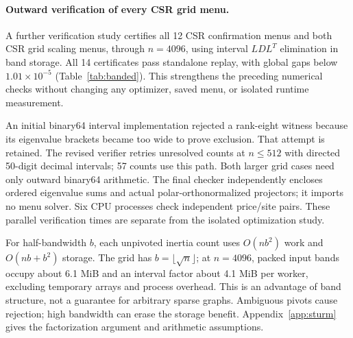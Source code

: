 \paragraph{Outward verification of every CSR grid menu.}
A further verification study certifies all 12 CSR confirmation menus and
both CSR grid scaling menus, through $n=4096$, using interval $LDL^T$
elimination in band storage. All 14 certificates pass standalone replay,
with global gaps below $1.01\times10^{-5}$ (Table~\ref{tab:banded}).
This strengthens the preceding numerical checks without changing any
optimizer, saved menu, or isolated runtime measurement.

An initial binary64 interval implementation rejected a rank-eight witness
because its eigenvalue brackets became too wide to prove exclusion. That
attempt is retained. The revised verifier retries unresolved counts at
$n\le512$ with directed 50-digit decimal intervals; 57 counts use this
path. Both larger grid cases need only outward binary64 arithmetic.
The final checker independently encloses ordered eigenvalue sums and actual
polar-orthonormalized projectors; it imports no menu solver. Six CPU
processes check independent price/site pairs. These parallel verification
times are separate from the isolated optimization study.

For half-bandwidth $b$, each unpivoted inertia count uses $O(nb^2)$ work
and $O(nb+b^2)$ storage. The grid has $b=\lfloor\sqrt n\rfloor$;
at $n=4096$, packed input bands occupy about 6.1 MiB and an interval factor
about 4.1 MiB per worker, excluding temporary arrays and process overhead.
This is an advantage of band structure, not a guarantee for arbitrary
sparse graphs. Ambiguous pivots cause rejection; high bandwidth can erase
the storage benefit. Appendix~\ref{app:sturm} gives the factorization
argument and arithmetic assumptions.

\begin{table}[t]\centering\small
\caption{Independently replayed outward certificates for CSR grid menus.
Decimal counts record successful higher-precision inertia retries;
the displayed gap column is rounded. All unrounded gaps are below
$1.01\times10^{-5}$.}
\label{tab:banded}
\end{table}
